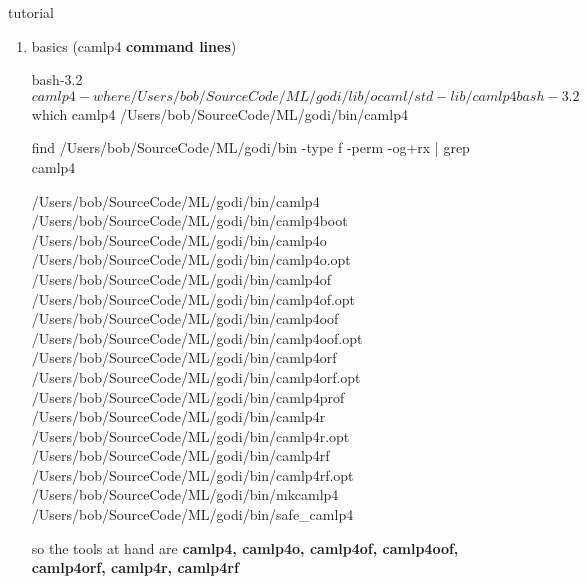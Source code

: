 \item tutorial
\begin{enumerate}
\item basics (camlp4 \textbf{ command lines})
\begin{alternate}
bash-3.2$ camlp4 -where
/Users/bob/SourceCode/ML/godi/lib/ocaml/std-lib/camlp4
bash-3.2$ which camlp4
/Users/bob/SourceCode/ML/godi/bin/camlp4
\end{alternate}

\begin{redcode}
find /Users/bob/SourceCode/ML/godi/bin -type f -perm -og+rx | grep camlp4
\end{redcode}
\begin{bluecode}  
/Users/bob/SourceCode/ML/godi/bin/camlp4
/Users/bob/SourceCode/ML/godi/bin/camlp4boot
/Users/bob/SourceCode/ML/godi/bin/camlp4o
/Users/bob/SourceCode/ML/godi/bin/camlp4o.opt
/Users/bob/SourceCode/ML/godi/bin/camlp4of
/Users/bob/SourceCode/ML/godi/bin/camlp4of.opt
/Users/bob/SourceCode/ML/godi/bin/camlp4oof
/Users/bob/SourceCode/ML/godi/bin/camlp4oof.opt
/Users/bob/SourceCode/ML/godi/bin/camlp4orf
/Users/bob/SourceCode/ML/godi/bin/camlp4orf.opt
/Users/bob/SourceCode/ML/godi/bin/camlp4prof
/Users/bob/SourceCode/ML/godi/bin/camlp4r
/Users/bob/SourceCode/ML/godi/bin/camlp4r.opt
/Users/bob/SourceCode/ML/godi/bin/camlp4rf
/Users/bob/SourceCode/ML/godi/bin/camlp4rf.opt
/Users/bob/SourceCode/ML/godi/bin/mkcamlp4
/Users/bob/SourceCode/ML/godi/bin/safe_camlp4
\end{bluecode}
  so the tools at hand are \textbf{camlp4, camlp4o, camlp4of, camlp4oof, camlp4orf, camlp4r, camlp4rf } 


\end{enumerate}
